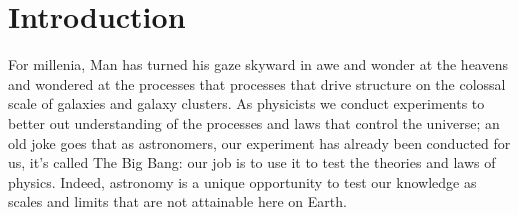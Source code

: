 \chapter{Introduction}
For millenia, Man has turned his gaze skyward in awe and wonder at the heavens and wondered at the processes that processes that drive structure on the colossal scale of galaxies and galaxy clusters. As physicists we conduct experiments to better out understanding of the processes and laws that control the universe; an old joke goes that as astronomers, our experiment has already been conducted for us, it's called The Big Bang: our job is to use it to test the theories and laws of physics. Indeed, astronomy is a unique opportunity to test our knowledge as scales and limits that are not attainable here on Earth.


